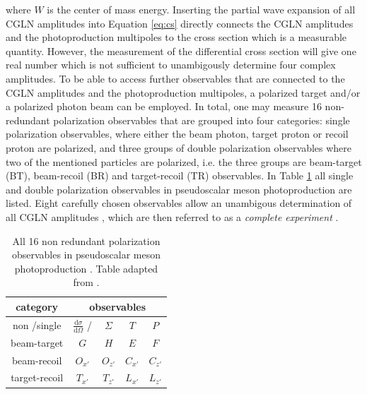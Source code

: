 where $W$ is the center of mass energy. Inserting the partial wave expansion of all CGLN amplitudes into Equation \eqref{eq:cs} directly connects the CGLN amplitudes and the photoproduction multipoles to the cross section which is a measurable quantity. However, the measurement of the differential cross section will give one real number which is not sufficient to unambigously determine four complex amplitudes. To be able to access further observables that are connected to the CGLN amplitudes and the photoproduction multipoles, a polarized target and/or a polarized photon beam can be employed. In total, one may measure 16 non-redundant polarization observables \cite{san} that are grouped into four categories: single polarization observables, where either the beam photon, target proton or recoil proton are polarized, and three groups of double polarization observables where two of the mentioned particles are polarized, i.e. the three groups are beam-target (BT), beam-recoil (BR) and target-recoil (TR) observables. In Table \ref{tab:pol} all single and double polarization observables in pseudoscalar meson photoproduction are listed. Eight carefully chosen observables allow an unambigous determination of all CGLN amplitudes \cite{chiang}, which are then referred to as a \emph{complete experiment} \cite{chiang,san}.
\begin{table}[htbp]
	\centering
	\begin{tabular}{c|cccc}
	\toprule
		\textbf{category}&\multicolumn{4}{c}{\textbf{observables}}\\
		\hline
		non /single & $\frac{\text{d}\sigma}{\text{d}\Omega}$ / & $\Sigma$ &$T$&$P$\\
		beam-target&$G$&$H$&$E$&$F$\\
		beam-recoil&$O_{x'}$&$O_{z'}$&$C_{x'}$&$C_{z'}$\\
		target-recoil&$T_{x'}$&$T_{z'}$&$L_{x'}$&$L_{z'}$\\
		\bottomrule
	\end{tabular}
\caption{All 16 non redundant polarization observables in pseudoscalar meson photoproduction \cite{san}. Table adapted from \cite{farahmsc}.}
\label{tab:pol}
\end{table}

